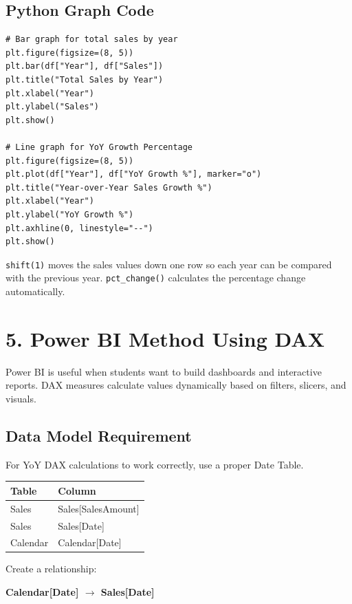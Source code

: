 \documentclass[11pt]{article}
\begin{document}
\subsection{Python Graph Code}
\begin{lstlisting}[style=pythonstyle]
# Bar graph for total sales by year
plt.figure(figsize=(8, 5))
plt.bar(df["Year"], df["Sales"])
plt.title("Total Sales by Year")
plt.xlabel("Year")
plt.ylabel("Sales")
plt.show()

# Line graph for YoY Growth Percentage
plt.figure(figsize=(8, 5))
plt.plot(df["Year"], df["YoY Growth %"], marker="o")
plt.title("Year-over-Year Sales Growth %")
plt.xlabel("Year")
plt.ylabel("YoY Growth %")
plt.axhline(0, linestyle="--")
plt.show()
\end{lstlisting}

\begin{tcolorbox}[colback=LightGray,colframe=DeepNavy,title=Python Explanation]
\texttt{shift(1)} moves the sales values down one row so each year can be compared with the previous year. \texttt{pct\_change()} calculates the percentage change automatically.
\end{tcolorbox}

\newpage
\section{5. Power BI Method Using DAX}
Power BI is useful when students want to build dashboards and interactive reports. DAX measures calculate values dynamically based on filters, slicers, and visuals.

\subsection{Data Model Requirement}
For YoY DAX calculations to work correctly, use a proper Date Table.

\begin{center}
\begin{tabular}{ll}
\toprule
\textbf{Table} & \textbf{Column} \\
\midrule
Sales & Sales[SalesAmount] \\
Sales & Sales[Date] \\
Calendar & Calendar[Date] \\
\bottomrule
\end{tabular}
\end{center}

Create a relationship:
\begin{center}
\textbf{Calendar[Date]  $\rightarrow$  Sales[Date]}
\end{center}
\end{document}
